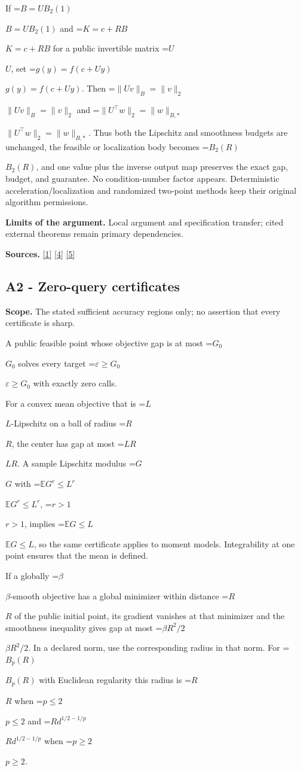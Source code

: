 \documentclass[10pt,a4paper]{article}
\newcommand{\AtlasMath}[1]{\par\begingroup\centering\setbox0=\hbox{$\displaystyle #1$}\ifdim\wd0>1.4\linewidth\typeout{ATLAS WIDE FORMULA: \the\wd0}\fi\ifdim\wd0>\linewidth\resizebox{\linewidth}{!}{\box0}\else\box0\fi\par\endgroup}
\newcommand{\AtlasInlineMath}[1]{\begingroup\setbox0=\hbox{$#1$}\ifdim\wd0>.4\linewidth\endgroup\AtlasMath{#1}\else\endgroup$#1$\fi}
\begin{document}
If \AtlasInlineMath{B=UB_2(1)} and \AtlasInlineMath{K=c+RB} for a public invertible matrix \AtlasInlineMath{U}, set \AtlasInlineMath{g(y)=f(c+Uy)}. Then \AtlasInlineMath{\|Uv\|_B=\|v\|_2} and \AtlasInlineMath{\|U^\top w\|_2=\|w\|_{B,*}}. Thus both the Lipschitz and smoothness budgets are unchanged, the feasible or localization body becomes \AtlasInlineMath{B_2(R)}, and one value plus the inverse output map preserves the exact gap, budget, and guarantee. No condition-number factor appears. Deterministic acceleration/localization and randomized two-point methods keep their original algorithm permissions.

\textbf{Limits of the argument.} Local argument and specification transfer; cited external theorems remain primary dependencies.

\textbf{Sources.} \href{https://arxiv.org/html/2610.00345v1}{[1]} \href{https://arxiv.org/html/2607.16558v2}{[4]} \href{https://www.mathnet.ru/php/archive.phtml?jrnid=mzm&option_lang=eng&paperid=1697&wshow=paper}{[5]}

\subsection{A2 - Zero-query certificates}
\textbf{Scope.} The stated sufficient accuracy regions only; no assertion that every certificate is sharp.

A public feasible point whose objective gap is at most \AtlasInlineMath{G_0} solves every target \AtlasInlineMath{\varepsilon\ge G_0} with exactly zero calls.

For a convex mean objective that is \AtlasInlineMath{L}-Lipschitz on a ball of radius \AtlasInlineMath{R}, the center has gap at most \AtlasInlineMath{LR}. A sample Lipschitz modulus \AtlasInlineMath{G} with \AtlasInlineMath{\mathbb E G^r\le L^r}, \AtlasInlineMath{r>1}, implies \AtlasInlineMath{\mathbb E G\le L}, so the same certificate applies to moment models. Integrability at one point ensures that the mean is defined.

If a globally \AtlasInlineMath{\beta}-smooth objective has a global minimizer within distance \AtlasInlineMath{R} of the public initial point, its gradient vanishes at that minimizer and the smoothness inequality gives gap at most \AtlasInlineMath{\beta R^2/2}. In a declared norm, use the corresponding radius in that norm. For \AtlasInlineMath{B_p(R)} with Euclidean regularity this radius is \AtlasInlineMath{R} when \AtlasInlineMath{p\le2} and \AtlasInlineMath{R d^{1/2-1/p}} when \AtlasInlineMath{p\ge2}.
\end{document}
